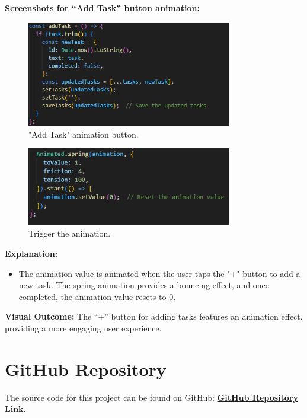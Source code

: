 \documentclass[12pt]{article}
\begin{document}
\textbf{Screenshots for “Add Task” button animation:}  
\begin{figure}[H]
    \centering
    \includegraphics[width=0.8\textwidth]{images/animation2.png} 
    \caption{"Add Task" animation button.}
    \label{fig:add-task-animation-1}
\end{figure}
\begin{figure}[H]
    \centering
    \includegraphics[width=0.8\textwidth]{images/animated3.png} 
    \caption{Trigger the animation.}
    \label{fig:add-task-animation-2}
\end{figure}
\textbf{Explanation:}  
\begin{itemize}[left=1.5em]
    \item The animation value is animated when the user taps the "+" button to add a new task. The spring animation provides a bouncing effect, and once completed, the animation value resets to 0.
\end{itemize}
\textbf{Visual Outcome:}  
The “+” button for adding tasks features an animation effect, providing a more engaging user experience.

\section*{GitHub Repository}
The source code for this project can be found on GitHub: 
\href{https://github.com/VennapusalaCharitha/SimpleTodoApp.git}{\textbf{GitHub Repository Link}}.
\end{document}

